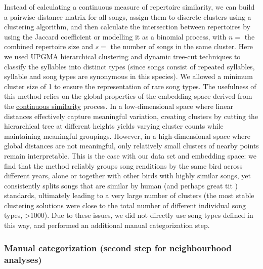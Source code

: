 \documentclass[9pt, onecolumn, twoside, lineno]{gsajnl}
\begin{document}
Instead of calculating a continuous measure of repertoire similarity, we can build a pairwise distance matrix for all songs, assign them to discrete clusters using a clustering algorithm, and then calculate the intersection between repertoires by using the Jaccard coefficient or modelling it as a binomial process, with $n = $ the combined repertoire size and $s = $ the number of songs in the same cluster. Here we used UPGMA hierarchical clustering and dynamic tree-cut techniques to classify the syllables into distinct types (since songs consist of repeated syllables, syllable and song types are synonymous in this species). We allowed a minimum cluster size of 1 to ensure the representation of rare song types. The usefulness of this method relies on the global properties of the embedding space derived from the \hyperref[sc:song-similarity]{continuous similarity} process. In a low-dimensional space where linear distances effectively capture meaningful variation, creating clusters by cutting the hierarchical tree at different heights yields varying cluster counts while maintaining meaningful groupings. However, in a high-dimensional space where global distances are not meaningful, only relatively small clusters of nearby points remain interpretable. This is the case with our data set and embedding space: we find that the method reliably groups song renditions by the same bird across different years, alone or together with other birds with highly similar songs, yet consistently splits songs that are similar by human (and perhaps great tit \autocite{falls1982}) standards, ultimately leading to a very large number of clusters (the most stable clustering solutions were close to the total number of different individual song types, >1000). Due to these issues, we did not directly use song types defined in this way, and performed an additional manual categorization step.

\subsubsection{Manual categorization (second step for neighbourhood analyses)}
\label{sc:manual-categorization}
\end{document}
